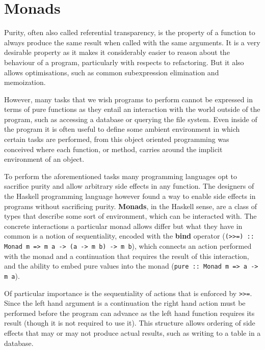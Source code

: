 \section{Monads}

\label{sec:monads}

Purity, often also called referential transparency, is the property of
a function to always produce the same result when called with the same
arguments. It is a very desirable property as it makes it considerably
easier to reason about the behaviour of a program, particularly with
respects to refactoring. But it also allows optimisations, such as
common subexpression elimination and memoization.

However, many tasks that we wish programs to perform cannot be
expressed in terms of pure functions as they entail an interaction
with the world outside of the program, such as accessing a database or
querying the file system. Even inside of the program it is often
useful to define some ambient environment in which certain tasks are
performed, from this object oriented programming was conceived where
each function, or method, carries around the implicit environment of
an object.

To perform the aforementioned tasks many programming languages opt to
sacrifice purity and allow arbitrary side effects in any function. The
designers of the Haskell programming language however found a way to
enable side effects in programs without sacrificing purity.
\textbf{Monads}, in the Haskell sense, are a class of types that
describe some sort of environment, which can be interacted with. The
concrete interactions a particular monad allows differ but what they
have in common is a notion of sequentiality, encoded with the
\textbf{bind} operator (\texttt{(>>=) :: Monad m => m a -> (a -> m b)
  -> m b}), which connects an action performed with the monad and a
continuation that requires the result of this interaction, and the
ability to embed pure values into the monad (\texttt{pure :: Monad m
  => a -> m a}).

Of particular importance is the sequentiality of actions that is
enforced by \texttt{>>=}. Since the left hand argument is a
continuation the right hand action must be performed before the
program can advance as the left hand function requires its result
(though it is not required to use it). This structure allows ordering
of side effects that may or may not produce actual results, such as
writing to a table in a database.

